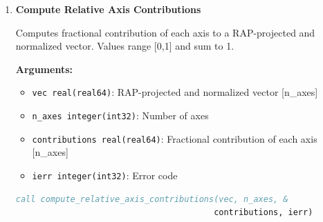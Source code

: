 \begin{enumerate}
    \textbf{Arguments:}
    \begin{itemize}
        \item \texttt{origins real(real64)}: First set of RAP-projected vectors (e.g., centroids) [n\_dims × n\_vecs]
        \item \texttt{targets real(real64)}: Second set of RAP-projected vectors (e.g., paralogs) [n\_dims × n\_vecs]
        \item \texttt{n\_dims integer(int32)}: Dimension of each vector in RAP space
        \item \texttt{n\_vecs integer(int32)}: Number of vector pairs
        \item \texttt{vecs\_selection\_mask logical}: Mask for vector pairs where angle should be computed [n\_vecs]
        \item \texttt{n\_selected\_vecs integer(int32)}: Count of selected vector pairs
        \item \texttt{selected\_axes\_for\_signed integer(int32)}: Indices of 3 axes for directionality [3]
        \item \texttt{signed\_angles real(real64)}: Output signed angles in radians [$-\pi$,$\pi$] [n\_selected\_vecs]
        \item \texttt{ierr integer(int32)}: Error code
    \end{itemize}
\begin{lstlisting}[language=Fortran, caption={Batch Angle Calculation}]
call clock_hand_angles_for_shift_vectors(origins, targets, n_dims, &
                                        n_vecs, vecs_selection_mask, &
                                        n_selected_vecs, &
                                        selected_axes_for_signed, &
                                        signed_angles, ierr)
\end{lstlisting}

    \item \textbf{Compute Relative Axis Contributions}

    Computes fractional contribution of each axis to a RAP-projected and normalized vector. Values range [0,1] and sum to 1.
    
    \textbf{Arguments:}
    \begin{itemize}
        \item \texttt{vec real(real64)}: RAP-projected and normalized vector [n\_axes]
        \item \texttt{n\_axes integer(int32)}: Number of axes
        \item \texttt{contributions real(real64)}: Fractional contribution of each axis [n\_axes]
        \item \texttt{ierr integer(int32)}: Error code
    \end{itemize}
\begin{lstlisting}[language=Fortran, caption={Axis Contribution Analysis}]
call compute_relative_axis_contributions(vec, n_axes, &
                                        contributions, ierr)
\end{lstlisting}


\end{enumerate}
